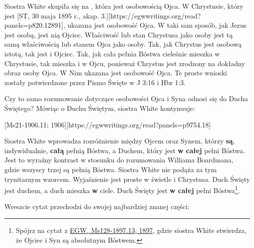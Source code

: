 Siostra White skupiła się na , która jest osobowością Ojca. W Chrystusie, który jest [ST, 30 maja 1895 r., akap. 3.][https://egwwritings.org/read?panels=p820.12891], ukazana jest osobowość Ojca. W taki sam sposób, jak Jezus jest osobą, jest nią Ojciec. Właściwość lub stan Chrystusa jako osoby jest tą samą właściwością lub stanem Ojca jako osoby. Tak, jak Chrystus jest osobową istotą, tak jest i Ojciec. Tak, jak cała pełnia Bóstwa cieleśnie mieszka w Chrystusie, tak mieszka i w Ojcu, ponieważ Chrystus jest zrodzony na dokładny obraz osoby Ojca. W Nim ukazana jest osobowość Ojca. Te proste wnioski zostały potwierdzone przez Pismo Święte w J 3:16 i Hbr 1:3.

Czy to samo rozumowanie dotyczące osobowości Ojca i Syna odnosi się do Ducha Świętego? Mówiąc o Duchu Świętym, siostra White kontynuuje:

[Ms21-1906.11; 1906][https://egwwritings.org/read?panels=p9754.18]

Siostra White wprowadza rozróżnienie między Ojcem oraz Synem, którzy \textbf{są}, indywidualnie, \textbf{całą} pełnią Bóstwa, a Duchem, który jest \textbf{w całej} pełni Bóstwa. Jest to wyraźny kontrast w stosunku do rozumowania Williama Boardmana, gdzie wszyscy trzej są pełnią Bóstwa. Siostra White nie podąża za tym trynitarnym wzorcem. Wyjaśnienie jest proste w świetle  i Chrystusa. Duch Święty jest duchem, a duch mieszka \textbf{w} ciele. Duch Święty jest \textbf{w całej} pełni Bóstwa\footnote{Spójrz na cytat z \href{https://egwwritings.org/?ref=en_Ms128-1897.13&para=5426.19}{{EGW, Ms128-1897.13; 1897}}, gdzie siostra White stwierdza, że Ojciec i Syn są absolutnym Bóstwem.}.

Wreszcie cytat przechodzi do swojej najbardziej znanej części:


